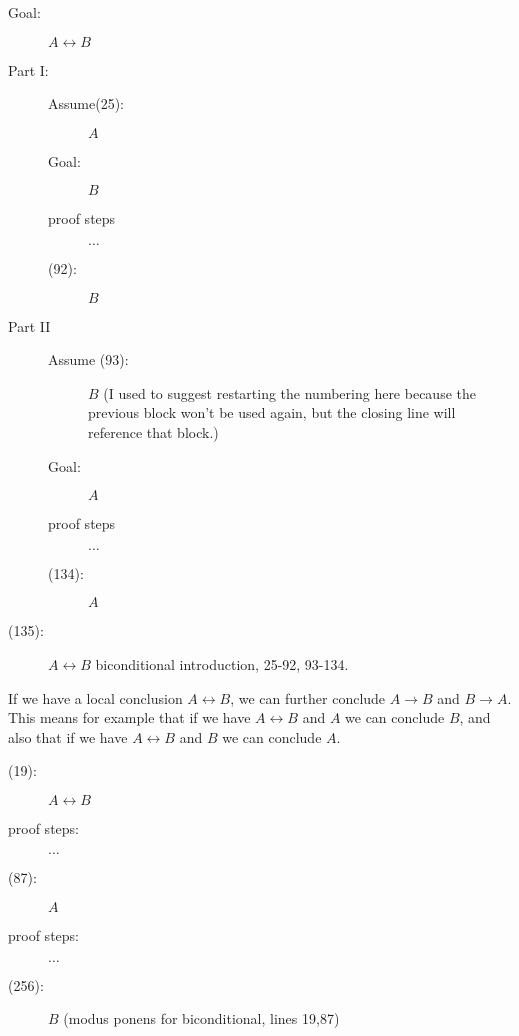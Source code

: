 \documentclass[12pt]{article}
\begin{document}
\begin{description}

\item[ Goal:]  $A \leftrightarrow B$

\item[Part I:]

\begin{description}

\item[Assume(25):]  $A$

\item[Goal:]  $B$

\item[proof steps] $\ldots$

\item[(92):]  $B$


\end{description}

\item[Part II]

\begin{description}



\item[Assume (93):]  $B$  (I used to suggest restarting the numbering here because the previous block won't be used again, but the closing line will reference that block.)

\item[Goal:] $A$

\item[proof steps]  $\ldots$

\item[(134):]  $A$


\end{description}

\item[(135):]  $A \leftrightarrow B$ biconditional introduction, 25-92, 93-134.

\end{description}

If we have a local conclusion $A \leftrightarrow B$, we can further
conclude $A \rightarrow B$ and $B \rightarrow A$.  This means for
example that if we have $A \leftrightarrow B$ and $A$ we can conclude
$B$, and also that if we have $A \leftrightarrow B$ and $B$ we can
conclude $A$.


\begin{description}
\item[(19):]  $A \leftrightarrow B$

\item[proof steps:]  $\ldots$

\item[(87):]  $A$

\item[proof steps:]  $\ldots$

\item [(256):]  $B$ (modus ponens for biconditional, lines 19,87)


\end{description}
\end{document}
